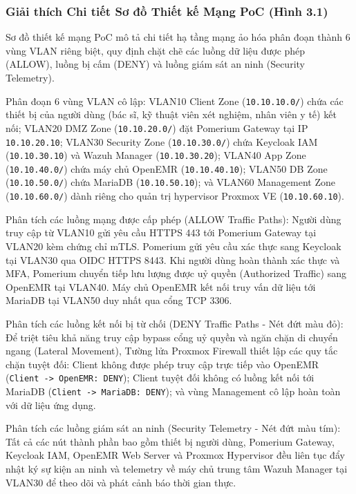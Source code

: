 \subsubsection{Giải thích Chi tiết Sơ đồ Thiết kế Mạng PoC (Hình 3.1)}

Sơ đồ thiết kế mạng PoC mô tả chi tiết hạ tầng mạng ảo hóa phân đoạn thành 6 vùng VLAN riêng biệt, quy định chặt chẽ các luồng dữ liệu được phép (ALLOW), luồng bị cấm (DENY) và luồng giám sát an ninh (Security Telemetry).

Phân đoạn 6 vùng VLAN cô lập: VLAN10 Client Zone (\texttt{10.10.10.0/}) chứa các thiết bị của người dùng (bác sĩ, kỹ thuật viên xét nghiệm, nhân viên y tế) kết nối; VLAN20 DMZ Zone (\texttt{10.10.20.0/}) đặt Pomerium Gateway tại IP \texttt{10.10.20.10}; VLAN30 Security Zone (\texttt{10.10.30.0/}) chứa Keycloak IAM (\texttt{10.10.30.10}) và Wazuh Manager (\texttt{10.10.30.20}); VLAN40 App Zone (\texttt{10.10.40.0/}) chứa máy chủ OpenEMR (\texttt{10.10.40.10}); VLAN50 DB Zone (\texttt{10.10.50.0/}) chứa MariaDB (\texttt{10.10.50.10}); và VLAN60 Management Zone (\texttt{10.10.60.0/}) dành riêng cho quản trị hypervisor Proxmox VE (\texttt{10.10.60.10}).

Phân tích các luồng mạng được cấp phép (ALLOW Traffic Paths): Người dùng truy cập từ VLAN10 gửi yêu cầu HTTPS 443 tới Pomerium Gateway tại VLAN20 kèm chứng chỉ mTLS. Pomerium gửi yêu cầu xác thực sang Keycloak tại VLAN30 qua OIDC HTTPS 8443. Khi người dùng hoàn thành xác thực và MFA, Pomerium chuyển tiếp lưu lượng được uỷ quyền (Authorized Traffic) sang OpenEMR tại VLAN40. Máy chủ OpenEMR kết nối truy vấn dữ liệu tới MariaDB tại VLAN50 duy nhất qua cổng TCP 3306.

Phân tích các luồng kết nối bị từ chối (DENY Traffic Paths - Nét đứt màu đỏ): Để triệt tiêu khả năng truy cập bypass cổng uỷ quyền và ngăn chặn di chuyển ngang (Lateral Movement), Tường lửa Proxmox Firewall thiết lập các quy tắc chặn tuyệt đối: Client không được phép truy cập trực tiếp vào OpenEMR (\texttt{Client -> OpenEMR: DENY}); Client tuyệt đối không có luồng kết nối tới MariaDB (\texttt{Client -> MariaDB: DENY}); và vùng Management cô lập hoàn toàn với dữ liệu ứng dụng.

Phân tích các luồng giám sát an ninh (Security Telemetry - Nét đứt màu tím): Tất cả các nút thành phần bao gồm thiết bị người dùng, Pomerium Gateway, Keycloak IAM, OpenEMR Web Server và Proxmox Hypervisor đều liên tục đẩy nhật ký sự kiện an ninh và telemetry về máy chủ trung tâm Wazuh Manager tại VLAN30 để theo dõi và phát cảnh báo thời gian thực.

